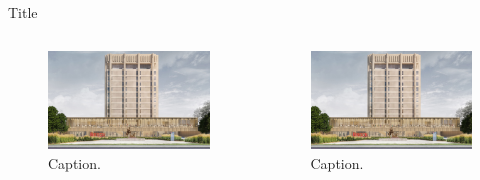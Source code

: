 \documentclass{beamer} %
\begin{document}
\begin{frame}{Title}
\begin{columns}[T]
    \begin{column}{.45\textwidth}
        \begin{figure}
        \centering
        \includegraphics[scale=0.05]{Figures/Brock-LINC-Project-South-Elevation.jpg}
        \caption{Caption.}
        \label{fig:label1}
        \end{figure}
    \end{column}
    \begin{column}{.48\textwidth}
        \begin{figure}
            \centering
            \includegraphics[scale=0.05]{Figures/Brock-LINC-Project-South-Elevation.jpg}
            \caption{Caption.}
            \label{fig:label2}
        \end{figure}
    \end{column}
\end{columns}

\end{frame}
\end{document}
